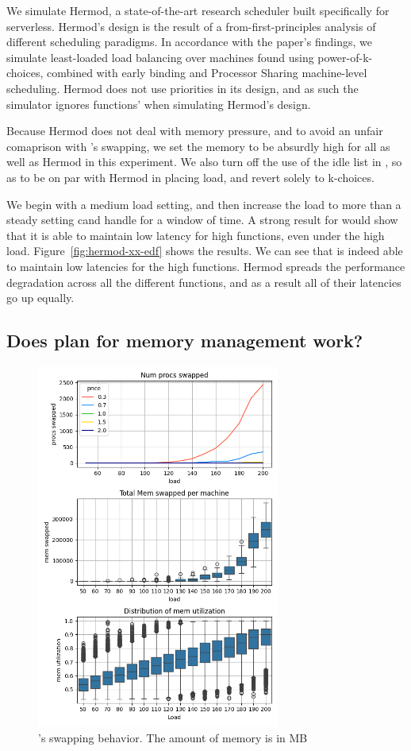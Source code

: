We simulate Hermod\cite{hermod}, a state-of-the-art research scheduler built
specifically for serverless. Hermod's design is the result of a
from-first-principles analysis of different scheduling paradigms. In accordance
with the paper's findings, we simulate least-loaded load balancing over machines
found using power-of-k-choices, combined with early binding and Processor
Sharing machine-level scheduling. Hermod does not use priorities in its design,
and as such the simulator ignores functions' \class{} when simulating Hermod's
design.

Because Hermod does not deal with memory pressure, and to avoid an unfair
comaprison with \sys{}'s swapping, we set the memory to be absurdly high for all
\sys{} as well as Hermod in this experiment. We also turn off the use of the
idle list in \sys{}, so as to be on par with Hermod in placing load, and revert
solely to k-choices.

We begin with a medium load setting, and then increase the load to more than a
steady setting cand handle for a window of time. A strong result for \sys{}
would show that it is able to maintain low latency for high \priceclass{}
functions, even under the high load. Figure~\ref{fig:hermod-xx-edf} shows the
results. We can see that \sys{} is indeed able to maintain low latencies for the
high \class{} functions. Hermod spreads the performance degradation across all
the different functions, and as a result all of their latencies go up equally.


\subsection{Does \sys{} plan for memory management work?}

\begin{figure}[t!]
    \centering
      \includegraphics[width=8cm]{img/memory_graphs.png}
      \caption{ \sys{}'s swapping behavior. The amount of memory is in MB  }
    \label{fig:memory-graphs}
\end{figure}

